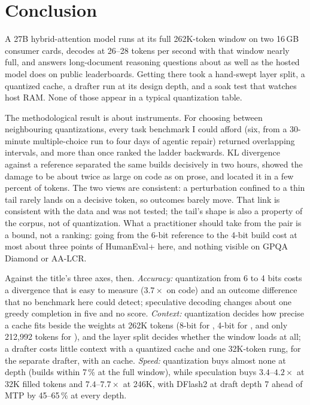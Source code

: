 \section{Conclusion}\label{sec:conclusion}

A 27B hybrid-attention model runs at its full 262K-token window on two 16\,GB consumer cards, decodes
at 26--28 tokens per second with that window nearly full, and answers long-document reasoning questions
about as well as the hosted model does on public leaderboards. Getting there took a hand-swept layer
split, a quantized cache, a drafter run at its design depth, and a soak test that watches host RAM.
None of those appear in a typical quantization table.

The methodological result is about instruments. For choosing between neighbouring quantizations, every
task benchmark I could afford (six, from a 30-minute multiple-choice run to four days of
agentic repair) returned overlapping intervals, and more than once ranked the ladder backwards. KL divergence
against a reference separated the same builds decisively in two hours, showed the damage to be about
twice as large on code as on prose, and located it in a few percent of tokens. The two views are
consistent: a perturbation confined to a thin tail rarely lands on a decisive token, so outcomes barely
move. That link is consistent with the data and was not tested; the tail's shape is also a property of
the corpus, not of quantization. What a practitioner should take from the pair is a bound, not a ranking: going from the 6-bit
reference to the 4-bit build cost at most about three points of HumanEval+ here, and nothing visible
on GPQA Diamond or AA-LCR.

Against the title's three axes, then. \emph{Accuracy:} quantization from 6 to 4 bits costs a
divergence that is easy to measure ($3.7\times$ on code) and an outcome difference that no benchmark here
could detect; speculative decoding changes about one greedy completion in five and no score.
\emph{Context:} quantization decides how precise a cache fits beside the weights at 262K tokens (8-bit
for \Qfour, 4-bit for \Qsix, and only 212{,}992 tokens for \QsixXL), and the layer split decides whether
the window loads at all; a drafter costs little context with a quantized cache and one 32K-token rung,
for the separate drafter, with an  cache. \emph{Speed:} quantization buys almost none at depth
(builds within 7\,\% at the full window), while speculation buys $3.4$--$4.2\times$ at 32K filled tokens
and $7.4$--$7.7\times$ at 246K, with DFlash2 at draft depth 7 ahead of MTP by 45--65\,\% at every depth.

